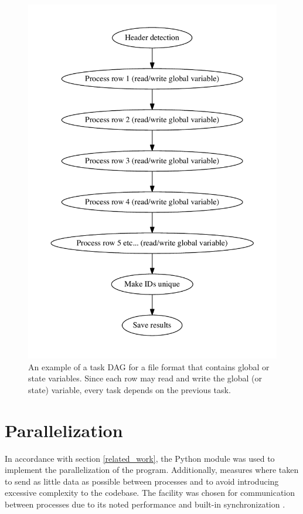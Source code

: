 \begin{figure}[ht]
  \centering
  \includegraphics[width=120mm]{figures/global_variable_file_format.pdf}
  \caption[Task DAG for a file format that contains global or state variables.]{An example of a task DAG for a file format that contains global or state variables. Since each row may read and
  write the global (or state) variable, every task depends on the previous task.}
  \label{fig:global_dag}
\end{figure}

\section{Parallelization} %
In accordance with section \ref{related_work}, the Python  module was used to implement the parallelization of the program. Additionally, measures where taken to send as little
data as possible between processes and to avoid introducing excessive complexity to the codebase. The  facility was chosen for communication between processes due to its
noted performance and built-in synchronization \cite{singh_2013_parallel_padpwprfmm}.

